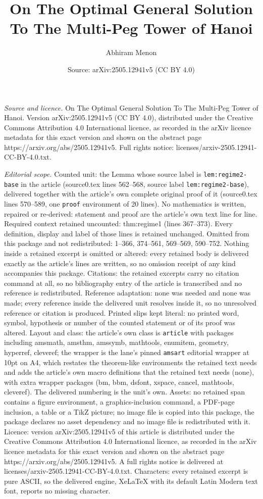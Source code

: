 \documentclass[10pt,a4paper]{amsart}
\title[On The Optimal General Solution To The Multi-Peg Tower of Ha]{On The Optimal General Solution To The Multi-Peg Tower of Hanoi}
\author{Abhiram Menon}
\date{Source: arXiv:2505.12941v5 (CC BY 4.0)}
\begin{document}
\maketitle

\noindent\emph{Source and licence.} On The Optimal General Solution To The Multi-Peg Tower of Hanoi. Version arXiv:2505.12941v5 (CC BY 4.0), distributed under the Creative Commons Attribution 4.0 International licence, as recorded in the arXiv licence metadata for this exact version and shown on the abstract page https://arxiv.org/abs/2505.12941v5. Full rights notice: licenses/arxiv-2505.12941-CC-BY-4.0.txt.\par\smallskip

\noindent\textit{Editorial scope.} Counted unit: the Lemma whose source label is \texttt{lem:regime2-base} in the article (source0.tex lines 562--568, source label \texttt{lem:regime2-base}), delivered together with the article's own complete original proof of it (source0.tex lines 570--589, one \texttt{proof} environment of 20 lines). No mathematics is written, repaired or re-derived: statement and proof are the article's own text line for line. Required context retained uncounted: thm:regime1 (lines 367--373). Every definition, display and label of those lines is retained unchanged. Omitted from this package and not redistributed: 1--366, 374--561, 569--569, 590--752. Nothing inside a retained excerpt is omitted or altered: every retained body is delivered exactly as the article's lines are written, so no omission receipt of any kind accompanies this package. Citations: the retained excerpts carry no citation command at all, so no bibliography entry of the article is transcribed and no reference is redistributed. Reference adaptation: none was needed and none was made; every reference inside the delivered unit resolves inside it, so no unresolved reference or citation is produced. Printed slips kept literal: no printed word, symbol, hypothesis or number of the counted statement or of its proof was altered. Layout and class: the article's own class is \texttt{article} with packages including amsmath, amsthm, amssymb, mathtools, enumitem, geometry, hyperref, cleveref; the wrapper is the lane's pinned \texttt{amsart} editorial wrapper at 10pt on A4, which restates the theorem-like environments the retained text needs and adds the article's own macro definitions that the retained text needs (none), with extra wrapper packages (bm, bbm, dsfont, xspace, cancel, mathtools, cleveref). The delivered numbering is the unit's own. Assets: no retained span contains a figure environment, a graphics-inclusion command, a PDF-page inclusion, a table or a TikZ picture; no image file is copied into this package, the package declares no asset dependency and no image file is redistributed with it. Licence: version arXiv:2505.12941v5 of this article is distributed under the Creative Commons Attribution 4.0 International licence, as recorded in the arXiv licence metadata for this exact version and shown on the abstract page https://arxiv.org/abs/2505.12941v5. A full rights notice is delivered at licenses/arxiv-2505.12941-CC-BY-4.0.txt. Characters: every retained excerpt is pure ASCII, so the delivered engine, XeLaTeX with its default Latin Modern text font, reports no missing character.
\end{document}
